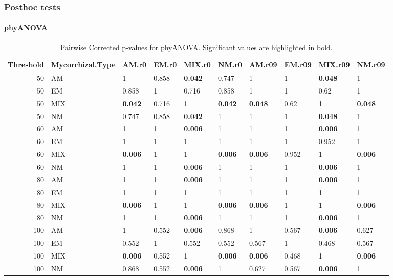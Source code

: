 \documentclass[]{article}
\let\oldparagraph\paragraph
\renewcommand{\paragraph}[1]{\oldparagraph{#1}\mbox{}}
\begin{document}
\hypertarget{posthoc-tests}{%
\subsubsection{Posthoc tests}\label{posthoc-tests}}

\hypertarget{phyanova-5}{%
\paragraph{phyANOVA}\label{phyanova-5}}

\begin{table}[H]

\caption{\label{tab:unnamed-chunk-26}Pairwise Corrected p-values for phyANOVA. Significant values are highlighted in bold.}
\centering
\begin{tabular}{r|l|l|l|l|l|l|l|l|l}
\hline
Threshold & Mycorrhizal.Type & AM.r0 & EM.r0 & MIX.r0 & NM.r0 & AM.r09 & EM.r09 & MIX.r09 & NM.r09\\
\hline
50 & AM & 1 & 0.858 & \textbf{0.042} & 0.747 & 1 & 1 & \textbf{0.048} & 1\\
\hline
50 & EM & 0.858 & 1 & 0.716 & 0.858 & 1 & 1 & 0.62 & 1\\
\hline
50 & MIX & \textbf{0.042} & 0.716 & 1 & \textbf{0.042} & \textbf{0.048} & 0.62 & 1 & \textbf{0.048}\\
\hline
50 & NM & 0.747 & 0.858 & \textbf{0.042} & 1 & 1 & 1 & \textbf{0.048} & 1\\
\hline
60 & AM & 1 & 1 & \textbf{0.006} & 1 & 1 & 1 & \textbf{0.006} & 1\\
\hline
60 & EM & 1 & 1 & 1 & 1 & 1 & 1 & 0.952 & 1\\
\hline
60 & MIX & \textbf{0.006} & 1 & 1 & \textbf{0.006} & \textbf{0.006} & 0.952 & 1 & \textbf{0.006}\\
\hline
60 & NM & 1 & 1 & \textbf{0.006} & 1 & 1 & 1 & \textbf{0.006} & 1\\
\hline
80 & AM & 1 & 1 & \textbf{0.006} & 1 & 1 & 1 & \textbf{0.006} & 1\\
\hline
80 & EM & 1 & 1 & 1 & 1 & 1 & 1 & 1 & 1\\
\hline
80 & MIX & \textbf{0.006} & 1 & 1 & \textbf{0.006} & \textbf{0.006} & 1 & 1 & \textbf{0.006}\\
\hline
80 & NM & 1 & 1 & \textbf{0.006} & 1 & 1 & 1 & \textbf{0.006} & 1\\
\hline
100 & AM & 1 & 0.552 & \textbf{0.006} & 0.868 & 1 & 0.567 & \textbf{0.006} & 0.627\\
\hline
100 & EM & 0.552 & 1 & 0.552 & 0.552 & 0.567 & 1 & 0.468 & 0.567\\
\hline
100 & MIX & \textbf{0.006} & 0.552 & 1 & \textbf{0.006} & \textbf{0.006} & 0.468 & 1 & \textbf{0.006}\\
\hline
100 & NM & 0.868 & 0.552 & \textbf{0.006} & 1 & 0.627 & 0.567 & \textbf{0.006} & 1\\
\hline
\end{tabular}
\end{table}
\end{document}
